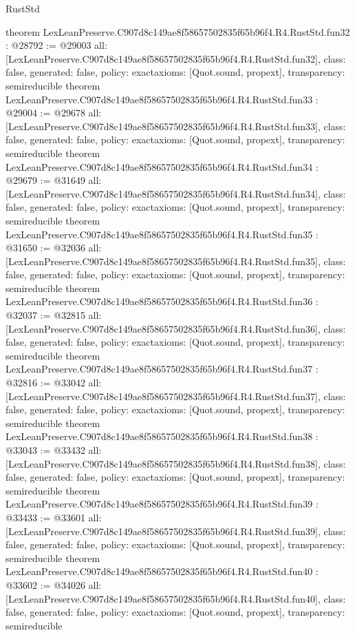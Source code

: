 \begin{lexlean}{RustStd}
\begin{coremodule}
{}
theorem LexLeanPreserve.C907d8c149ae8f58657502835f65b96f4.R4.RustStd.fun32 : @28792 := @29003 {
  all: [LexLeanPreserve.C907d8c149ae8f58657502835f65b96f4.R4.RustStd.fun32],
  class: false,
  generated: false,
  policy: exact{axioms: [Quot.sound, propext]},
  transparency: semireducible
}
theorem LexLeanPreserve.C907d8c149ae8f58657502835f65b96f4.R4.RustStd.fun33 : @29004 := @29678 {
  all: [LexLeanPreserve.C907d8c149ae8f58657502835f65b96f4.R4.RustStd.fun33],
  class: false,
  generated: false,
  policy: exact{axioms: [Quot.sound, propext]},
  transparency: semireducible
}
theorem LexLeanPreserve.C907d8c149ae8f58657502835f65b96f4.R4.RustStd.fun34 : @29679 := @31649 {
  all: [LexLeanPreserve.C907d8c149ae8f58657502835f65b96f4.R4.RustStd.fun34],
  class: false,
  generated: false,
  policy: exact{axioms: [Quot.sound, propext]},
  transparency: semireducible
}
theorem LexLeanPreserve.C907d8c149ae8f58657502835f65b96f4.R4.RustStd.fun35 : @31650 := @32036 {
  all: [LexLeanPreserve.C907d8c149ae8f58657502835f65b96f4.R4.RustStd.fun35],
  class: false,
  generated: false,
  policy: exact{axioms: [Quot.sound, propext]},
  transparency: semireducible
}
theorem LexLeanPreserve.C907d8c149ae8f58657502835f65b96f4.R4.RustStd.fun36 : @32037 := @32815 {
  all: [LexLeanPreserve.C907d8c149ae8f58657502835f65b96f4.R4.RustStd.fun36],
  class: false,
  generated: false,
  policy: exact{axioms: [Quot.sound, propext]},
  transparency: semireducible
}
theorem LexLeanPreserve.C907d8c149ae8f58657502835f65b96f4.R4.RustStd.fun37 : @32816 := @33042 {
  all: [LexLeanPreserve.C907d8c149ae8f58657502835f65b96f4.R4.RustStd.fun37],
  class: false,
  generated: false,
  policy: exact{axioms: [Quot.sound, propext]},
  transparency: semireducible
}
theorem LexLeanPreserve.C907d8c149ae8f58657502835f65b96f4.R4.RustStd.fun38 : @33043 := @33432 {
  all: [LexLeanPreserve.C907d8c149ae8f58657502835f65b96f4.R4.RustStd.fun38],
  class: false,
  generated: false,
  policy: exact{axioms: [Quot.sound, propext]},
  transparency: semireducible
}
theorem LexLeanPreserve.C907d8c149ae8f58657502835f65b96f4.R4.RustStd.fun39 : @33433 := @33601 {
  all: [LexLeanPreserve.C907d8c149ae8f58657502835f65b96f4.R4.RustStd.fun39],
  class: false,
  generated: false,
  policy: exact{axioms: [Quot.sound, propext]},
  transparency: semireducible
}
theorem LexLeanPreserve.C907d8c149ae8f58657502835f65b96f4.R4.RustStd.fun40 : @33602 := @34026 {
  all: [LexLeanPreserve.C907d8c149ae8f58657502835f65b96f4.R4.RustStd.fun40],
  class: false,
  generated: false,
  policy: exact{axioms: [Quot.sound, propext]},
  transparency: semireducible
}
\end{coremodule}
\end{lexlean}
